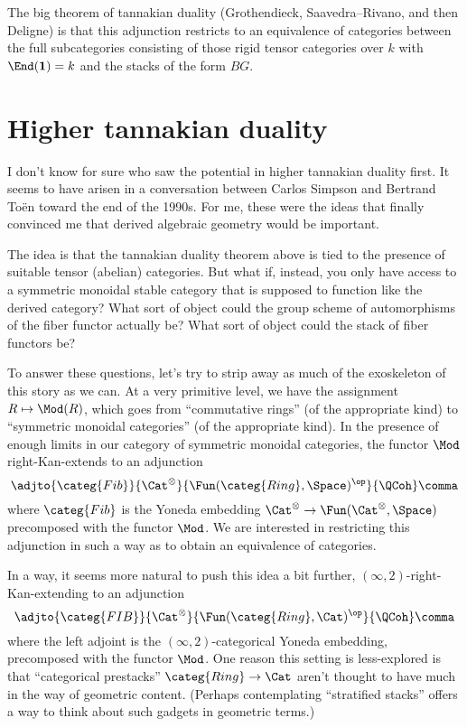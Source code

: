 \documentclass[leqno]{article}
\begin{document}
The big theorem of tannakian duality
(Grothendieck, Saavedra--Rivano, and then Deligne)
is that this adjunction restricts to an equivalence of categories
between the full subcategories consisting of
those rigid tensor categories over \(k\) with \(\End(\mathbf{1})=k\) and the stacks of the form \(BG\).

\section{Higher tannakian duality}%
\label{highertannakian}

I don't know for sure who saw the potential
in higher tannakian duality first.
It seems to have arisen in a conversation between
Carlos Simpson and Bertrand Toën toward the end of the 1990s.
For me, these were the ideas that finally convinced me that
derived algebraic geometry would be important.

The idea is that the tannakian duality theorem above
is tied to the presence of suitable tensor (abelian) categories.
But what if, instead, you only have access to
a symmetric monoidal stable category that is supposed to function
like the derived category?
What sort of object could the group scheme
of automorphisms of the fiber functor actually be?
What sort of object could the stack of fiber functors be?

To answer these questions, let's try to strip away
as much of the exoskeleton of this story as we can.
At a very primitive level, we have the assignment
\(R \mapsto \Mod(R)\), which goes from \enquote{commutative rings}
(of the appropriate kind)
to \enquote{symmetric monoidal categories}
(of the appropriate kind).
In the presence of enough limits
in our category of symmetric monoidal categories,
the functor \(\Mod\) right-Kan-extends to an adjunction
\begin{equation*}
    \adjto{\categ{Fib}}{\Cat^{\otimes}}
    {\Fun(\categ{Ring},\Space)^{\op}}{\QCoh} \comma
\end{equation*}
where \(\categ{Fib}\) is the Yoneda embedding
\(\Cat^{\otimes} \to \Fun(\Cat^{\otimes},\Space)\)
precomposed with the functor \(\Mod\).
We are interested in restricting this adjunction
in such a way as to obtain an equivalence of categories.

In a way, it seems more natural to push this idea a bit further,
\((\infty,2)\)-right-Kan-extending to an adjunction
\begin{equation*}
    \adjto{\categ{FIB}}{\Cat^{\otimes}}
    {\Fun(\categ{Ring},\Cat)^{\op}}{\QCoh} \comma
\end{equation*}
where the left adjoint is the \((\infty,2)\)-categorical
Yoneda embedding, precomposed with the functor \(\Mod\).
One reason this setting is less-explored is that
\enquote{categorical prestacks} \(\categ{Ring} \to \Cat\)
aren't thought to have
much in the way of geometric content.
(Perhaps contemplating \enquote{stratified stacks} offers
a way to think about such gadgets in geometric terms.)
\end{document}
